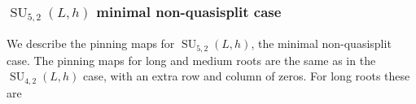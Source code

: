 \documentclass[12pt]{article}
\theoremstyle{definition}
\numberwithin{theorem}{subsection}
\newcommand{\sig}{\sigma}
\newcommand{\noi}{\noindent}
\newcommand{\inv}{^{-1}}
\newcommand{\ov}{\overline}
\DeclareMathOperator{\SU}{SU}
\begin{document}
%

\subsubsection{$\SU_{5,2}(L,h)$ minimal non-quasisplit case}

We describe the pinning maps for $\SU_{5,2}(L,h)$, the minimal non-quasisplit case. The pinning maps for long and medium roots are the same as in the $\SU_{4,2}(L,h)$ case, with an extra row and column of zeros. For long roots these are
\end{document}
